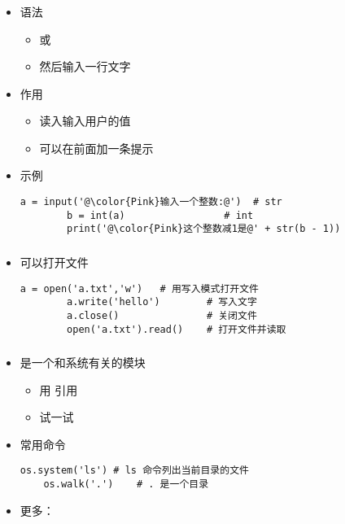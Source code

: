 \begin{CJK}{UTF8}{gbsn}
\begin{frame} [fragile]
	\frametitle{}
	\linespread{1.25}
	\begin{itemize}
	\item 语法
		\begin{itemize}
		\item {} 或 
		\item 然后输入一行文字
		\end{itemize}
	\item 作用
		\begin{itemize}
		\item 读入输入用户的值
		\item 可以在前面加一条提示
		\end{itemize}
	\item 示例
		\begin{lstlisting}[style=pythonstyle, gobble=8, texcl, escapechar=@]
		a = input('@\color{Pink}输入一个整数:@')	# str
		b = int(a)				   # int
		print('@\color{Pink}这个整数减1是@' + str(b - 1))
		\end{lstlisting}
	\end{itemize}
\end{frame}

\begin{frame} [fragile]
	\frametitle{}
	\linespread{1.25}
	\begin{itemize}
	\item {}可以打开文件
		\begin{lstlisting}[style=pythonstyle, gobble=8, texcl]
		a = open('a.txt','w')	# 用写入模式打开文件
		a.write('hello')		# 写入文字
		a.close()				# 关闭文件
		open('a.txt').read()	# 打开文件并读取
		\end{lstlisting}
	\end{itemize}
\end{frame}

\begin{frame} [fragile]
	\frametitle{}
	\linespread{1.25}
	\begin{itemize}
	\item {}是一个和系统有关的模块
		\begin{itemize}
		\item 用  引用
		\item 试一试 
		\end{itemize}
	\item 常用命令
	\begin{lstlisting}[style=pythonstyle, gobble=4, texcl]
	os.system('ls')	# ls 命令列出当前目录的文件
	os.walk('.')	# . 是一个目录
	\end{lstlisting}
	\item 更多：
	\end{itemize}
\end{frame}


\end{CJK}
